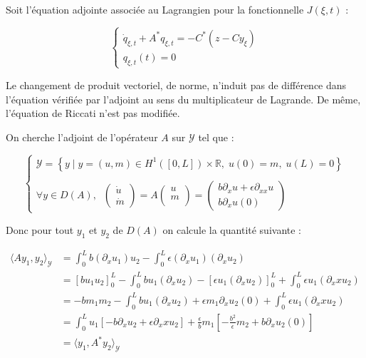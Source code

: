 \documentclass[a4paper]{article}
\newcommand{\dep}{b}
\begin{document}
Soit l'équation adjointe associée au Lagrangien pour la fonctionnelle $J(\xi,t)$ :

\begin{equation}
	\label{cas2:adjoint}
	\begin{cases}
	\dot{q}_{\xi,t} + A^* q_{\xi,t} = - C^*(z-Cy_{\xi}) \\
	q_{\xi,t}(t) =0
	\end{cases}
\end{equation}

\begin{remarque}
	Le changement de produit vectoriel, de norme, 
	n'induit pas de différence dans l'équation vérifiée par l'adjoint
	au sens du multiplicateur de Lagrande.
	De même, l'équation de Riccati n'est pas modifiée.
\end{remarque}

\vspace{0.3cm}
On cherche l'adjoint de l'opérateur $A$ sur $\mathscr{Y}$ tel que :

\begin{equation}
	\begin{cases}
		\mathscr{Y} = \left\{ y \; | \; y = (u,m) \in H^1([0,L])\times \mathbb{R},
 \; u(0)=m, \; u(L)=0 \right\} \\
        \\
        \forall y \in D(A), \; \;
		\left( \begin{array}{c}
		\dot{u}\\
		\dot{m}
		\end{array} \right)
		= A \left( \begin{array}{c}
		u\\
		m\\
		\end{array} \right) 
		= \left(\begin{array}{c}
		\dep \partial_x u + \epsilon \partial_{xx} u\\
		\dep \partial_x u(0)
		\end{array}\right)
	\end{cases}
\end{equation}

Donc pour tout $y_1$ et $y_2$ de $D(A)$ on calcule la quantité suivante :

\[ \begin{split}
\langle Ay_1,y_2 \rangle_{\mathscr{Y}} &= \int_0^L \dep (\partial_x u_1)u_2
                                     - \int_0^L \epsilon (\partial_x u_1)(\partial_x u_2)\\
					&= [\dep u_1u_2]_0^L
						- \int_0^L \dep u_1(\partial_x u_2)
						-[\epsilon u_1 (\partial_x u_2)]_0^L
						+ \int_0^L \epsilon u_1(\partial_xx u_2)\\
					&= -\dep m_1m_2
						- \int_0^L \dep u_1(\partial_x u_2)
						+\epsilon m_1 \partial_x u_2(0)
						+ \int_0^L \epsilon u_1(\partial_xx u_2)\\
					&= \int_0^L u_1 [- \dep \partial_x u_2 + \epsilon \partial_xx u_2]
						+ \displaystyle \frac{\epsilon}{\dep} m_1 
						[-\frac{\dep^2}{\epsilon} m_2 + \dep \partial_x u_2(0)]\\
					&= \langle y_1, A^* y_2 \rangle_{\mathscr{Y}}
\end{split} \]
\end{document}
